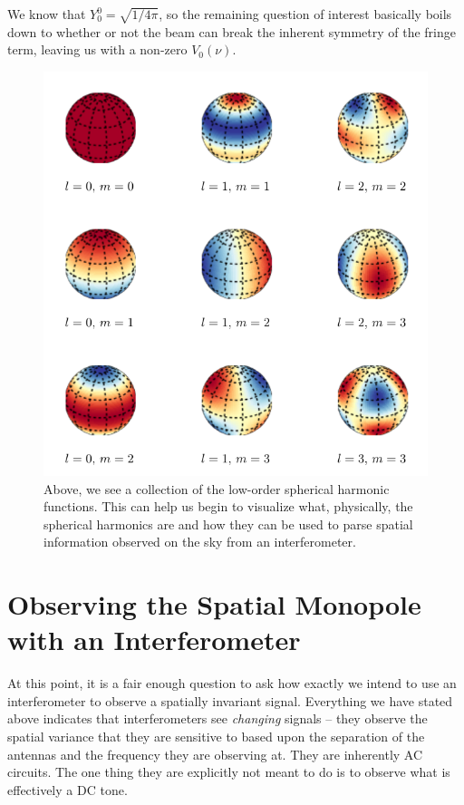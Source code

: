 We know that $Y_0^0 = \sqrt{1/4\pi}$, so the remaining question of interest 
basically boils down to whether or not the beam can break the inherent symmetry 
of the fringe term, leaving us with a non-zero $V_0(\nu)$.

\begin{figure}
    \begin{center}
    \includegraphics[width=\linewidth]{spherical_harmonics}
    \end{center}
    \caption{
         Above, we see a collection of the low-order spherical harmonic 
         functions. This can help us begin to visualize what, physically, the 
         spherical harmonics are and how they can be used to parse spatial 
         information observed on the sky from an interferometer.
    }
    \label{fig:spherical-harmonics}
\end{figure}

\section{Observing the Spatial Monopole with an Interferometer}
\label{sec:observing-monopole}

At this point, it is a fair enough question to ask how exactly we intend to use 
an interferometer to observe a spatially invariant signal. Everything we have 
stated above indicates that interferometers see \emph{changing} signals -- they 
observe the spatial variance that they are sensitive to based upon the 
separation of the antennas and the frequency they are observing at. They are 
inherently AC circuits. The one thing they are explicitly not meant to do is to 
observe what is effectively a DC tone.

